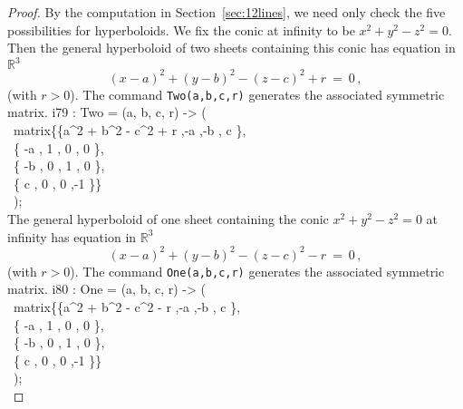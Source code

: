 \begin{proof}
By the computation in Section~\ref{sec:12lines}, 
we need only check the five possibilities for hyperboloids.
We fix the conic at infinity to be $x^2+y^2-z^2=0$.
Then the general hyperboloid of two sheets containing this conic has
equation in ${\mathbb R}^3$
%
\begin{equation}\label{eq:twoSheet}
  (x-a)^2+(y-b)^2-(z-c)^2+r\ =\ 0\,,
\end{equation}
%
(with $r>0$).
The command {\tt Two(a,b,c,r)} generates the associated 
symmetric matrix.
%
\beginOutput
i79 : Two = (a, b, c, r) -> (\\
\           matrix\{\{a^2 + b^2 - c^2 + r ,-a ,-b , c \},\\
\                  \{         -a         , 1 , 0 , 0 \},\\
\                  \{         -b         , 0 , 1 , 0 \},\\
\                  \{          c         , 0 , 0 ,-1 \}\}\\
\           );\\
\endOutput
The general hyperboloid of one sheet containing the conic
$x^2+y^2-z^2=0$ at infinity has equation in ${\mathbb R}^3$
%
\begin{equation}\label{eq:oneSheet}
  (x-a)^2+(y-b)^2-(z-c)^2-r\ =\ 0\,,
\end{equation}
%
(with $r>0$).
The command {\tt One(a,b,c,r)} generates the associated 
symmetric matrix.
%
\beginOutput
i80 : One = (a, b, c, r) -> (\\
\           matrix\{\{a^2 + b^2 - c^2 - r ,-a ,-b , c \},\\
\                  \{         -a         , 1 , 0 , 0 \},\\
\                  \{         -b         , 0 , 1 , 0 \},\\
\                  \{          c         , 0 , 0 ,-1 \}\}\\
\           );\\
\endOutput


\end{proof}
